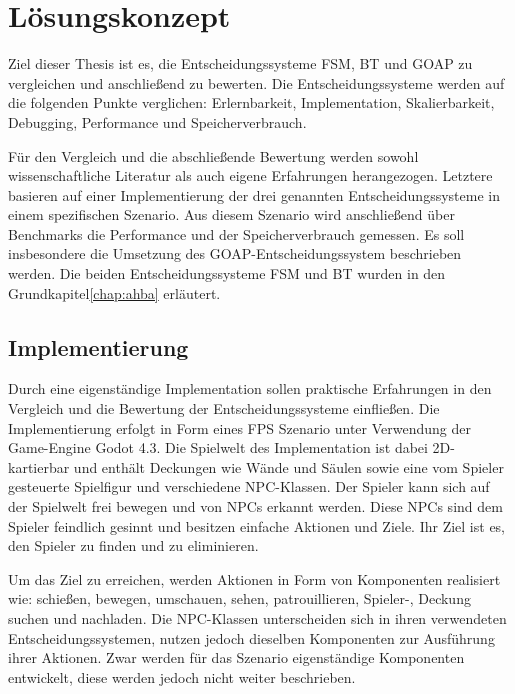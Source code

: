\chapter{L\"{o}sungskonzept}
\label{chap:loesungskonzept}

Ziel dieser Thesis ist es, die Entscheidungssysteme FSM, BT und GOAP zu vergleichen und anschlie\ss{}end zu bewerten. Die Entscheidungssysteme werden auf die folgenden Punkte verglichen: Erlernbarkeit, Implementation, Skalierbarkeit, Debugging, Performance und Speicherverbrauch.

F\"{u}r den Vergleich und die abschlie\ss{}ende Bewertung werden sowohl wissenschaftliche Literatur als auch eigene Erfahrungen herangezogen. Letztere basieren auf einer Implementierung der drei genannten Entscheidungssysteme in einem spezifischen Szenario. Aus diesem Szenario wird anschlie\ss{}end \"{u}ber Benchmarks die Performance und der Speicherverbrauch gemessen. Es soll insbesondere die Umsetzung des GOAP-Entscheidungssystem beschrieben werden. Die beiden Entscheidungssysteme FSM und BT wurden in den Grundkapitel\ref{chap:ahba} erl\"{a}utert.

\section{Implementierung}
\label{chap:lk implementierung}

Durch eine eigenst\"{a}ndige Implementation sollen praktische Erfahrungen in den Vergleich und die Bewertung der Entscheidungssysteme einflie\ss{}en. Die Implementierung erfolgt in Form eines FPS Szenario unter Verwendung der Game-Engine Godot 4.3. Die Spielwelt des Implementation ist dabei 2D-kartierbar und enth\"{a}lt Deckungen wie W\"{a}nde und S\"{a}ulen sowie eine vom Spieler gesteuerte Spielfigur und verschiedene NPC-Klassen. Der Spieler kann sich auf der Spielwelt frei bewegen und von NPCs erkannt werden. Diese NPCs sind dem Spieler feindlich gesinnt und besitzen einfache Aktionen und Ziele. Ihr Ziel ist es, den Spieler zu finden und zu eliminieren.

Um das Ziel zu erreichen, werden Aktionen in Form von Komponenten realisiert wie: schie\ss{}en, bewegen, umschauen, sehen, patrouillieren, Spieler-, Deckung suchen und nachladen. Die NPC-Klassen unterscheiden sich in ihren verwendeten Entscheidungssystemen, nutzen jedoch dieselben Komponenten zur Ausf\"{u}hrung ihrer Aktionen. Zwar werden f\"{u}r das Szenario eigenst\"{a}ndige Komponenten entwickelt, diese werden jedoch nicht weiter beschrieben.

